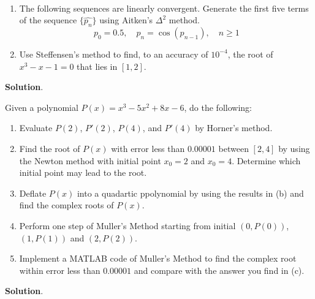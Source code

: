 \documentclass[11pt]{article}
\theoremstyle{break}
\numberwithin{equation}{theorem}
\begin{document}
\newpage
\begin{problem}\label{problem 10}$\ $
    \begin{enumerate}
        \item The following sequences are linearly convergent. Generate the first five terms of the sequence $\{\hat{p_n}\}$ using Aitken's $\Delta^2$ method.
        \begin{equation*}
            p_0=0.5, \quad p_n=\cos(p_{n-1}), \quad n\geq 1
        \end{equation*}
        \item Use Steffensen's method to find, to an accuracy of $10^{-4}$, the root of $x^3-x-1=0$ that lies in $[1, 2]$.
    \end{enumerate}
\end{problem}
\textbf{Solution}.


\newpage
\begin{problem}\label{problem 11}
    Given a polynomial $P(x) = x^3-5x^2+8x-6$, do the following:
    \begin{enumerate}
        \item Evaluate $P(2)$, $P'(2)$, $P(4)$, and $P'(4)$ by Horner's method.
        \item Find the root of $P(x)$ with error less than $0.00001$ between $[2, 4]$ by using the Newton method with initial point $x_0 = 2$ and $x_0 = 4$. Determine which initial point may lead to the root.
        \item Deflate $P(x)$ into a quadartic ppolynomial by using the results in (b) and find the complex roots of $P(x)$.
        \item Perform one step of Muller's Method starting from initial $(0,P(0))$, $(1,P(1))$ and $(2,P(2))$.
        \item Implement a MATLAB code of Muller's Method to find the complex root within error less than $0.00001$ and compare with the answer you find in (c).
    \end{enumerate}
\end{problem}
\textbf{Solution}.
\end{document}
